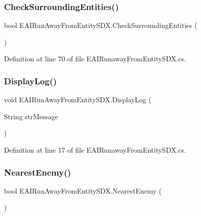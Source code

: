 \subsubsection{\texorpdfstring{CheckSurroundingEntities()}{CheckSurroundingEntities()}}
{\footnotesize\ttfamily bool E\+A\+I\+Run\+Away\+From\+Entity\+S\+D\+X.\+Check\+Surrounding\+Entities (\begin{DoxyParamCaption}{ }\end{DoxyParamCaption})}



Definition at line 70 of file E\+A\+I\+Runaway\+From\+Entity\+S\+D\+X.\+cs.

\mbox{\label{class_e_a_i_run_away_from_entity_s_d_x_a9e3ef2d95c8b095197fa92a9bb3b7bc5}} 
\subsubsection{\texorpdfstring{DisplayLog()}{DisplayLog()}}
{\footnotesize\ttfamily void E\+A\+I\+Run\+Away\+From\+Entity\+S\+D\+X.\+Display\+Log (\begin{DoxyParamCaption}\item[{String}]{str\+Message }\end{DoxyParamCaption})}



Definition at line 17 of file E\+A\+I\+Runaway\+From\+Entity\+S\+D\+X.\+cs.

\mbox{\label{class_e_a_i_run_away_from_entity_s_d_x_afc6aef51395f4c9f826a00b89e330165}} 
\subsubsection{\texorpdfstring{NearestEnemy()}{NearestEnemy()}}
{\footnotesize\ttfamily bool E\+A\+I\+Run\+Away\+From\+Entity\+S\+D\+X.\+Nearest\+Enemy (\begin{DoxyParamCaption}{ }\end{DoxyParamCaption})}



